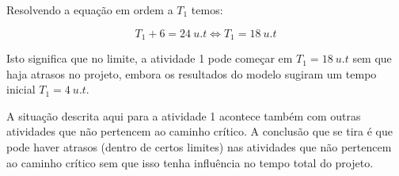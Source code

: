 Resolvendo a equação em ordem a $T_{1}$ temos:

\begin{displaymath}
T_{1} + 6 = 24~u.t \Leftrightarrow T_{1} = 18~u.t
\end{displaymath}

Isto significa que no limite, a atividade 1 pode começar em $T_{1} = 18~u.t$ sem que
haja atrasos no projeto, embora os resultados do modelo sugiram um tempo inicial $T_{1} = 4~u.t$.

A situação descrita aqui para a atividade 1 acontece também com outras atividades que não pertencem ao caminho crítico. A conclusão que se tira é que pode haver atrasos (dentro de certos limites) nas atividades que não pertencem ao caminho crítico sem que isso tenha influência no tempo total do projeto.

